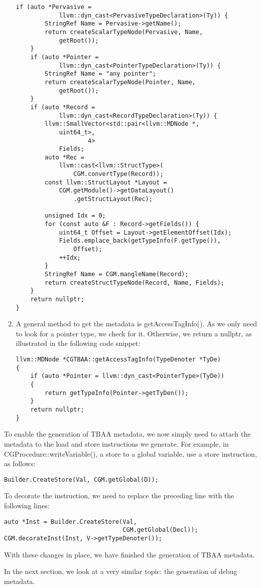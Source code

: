 \begin{enumerate}
\begin{lstlisting}[caption={}]
	if (auto *Pervasive =
			llvm::dyn_cast<PervasiveTypeDeclaration>(Ty)) {
		StringRef Name = Pervasive->getName();
		return createScalarTypeNode(Pervasive, Name, 
			getRoot());
	}
	if (auto *Pointer =
			llvm::dyn_cast<PointerTypeDeclaration>(Ty)) {
		StringRef Name = "any pointer";
		return createScalarTypeNode(Pointer, Name, 
			getRoot());
	}
	if (auto *Record =
			llvm::dyn_cast<RecordTypeDeclaration>(Ty)) {
		llvm::SmallVector<std::pair<llvm::MDNode *, 
			uint64_t>,
					4>
			Fields;
		auto *Rec =
			llvm::cast<llvm::StructType>(
				CGM.convertType(Record));
		const llvm::StructLayout *Layout =
			CGM.getModule()->getDataLayout()
				.getStructLayout(Rec);
			
		unsigned Idx = 0;
		for (const auto &F : Record->getFields()) {
			uint64_t Offset = Layout->getElementOffset(Idx);
			Fields.emplace_back(getTypeInfo(F.getType()), 
				Offset);
			++Idx;
		}
		StringRef Name = CGM.mangleName(Record);
		return createStructTypeNode(Record, Name, Fields);
	}
	return nullptr;
}
\end{lstlisting}

\item A general method to get the metadata is getAccessTagInfo(). As we only need to look for a pointer type, we check for it. Otherwise, we return a nullptr, as illustrated in the following code snippet:
\begin{lstlisting}[caption={}]
llvm::MDNode *CGTBAA::getAccessTagInfo(TypeDenoter *TyDe) 
{
	if (auto *Pointer = llvm::dyn_cast<PointerType>(TyDe)) 
	{
		return getTypeInfo(Pointer->getTyDen());
	}
	return nullptr;
}
\end{lstlisting}
\end{enumerate}

To enable the generation of TBAA metadata, we now simply need to attach the metadata to the load and store instructions we generate. For example, in CGProcedure::writeVariable(), a store to a global variable, use a store instruction, as follows:\par

\begin{lstlisting}[caption={}]
Builder.CreateStore(Val, CGM.getGlobal(D));
\end{lstlisting}

To decorate the instruction, we need to replace the preceding line with the following lines:\par

\begin{lstlisting}[caption={}]
auto *Inst = Builder.CreateStore(Val,
								 CGM.getGlobal(Decl));
CGM.decorateInst(Inst, V->getTypeDenoter());
\end{lstlisting}

With these changes in place, we have finished the generation of TBAA metadata.\par

In the next section, we look at a very similar topic: the generation of debug metadata.\par








